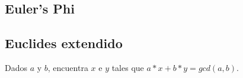 {%
\subsection{Euler's Phi}
\subsection{Euclides extendido}
Dados $a$ y $b$, encuentra $x$ e $y$ tales que $a*x + b*y = gcd(a, b)$.
}
